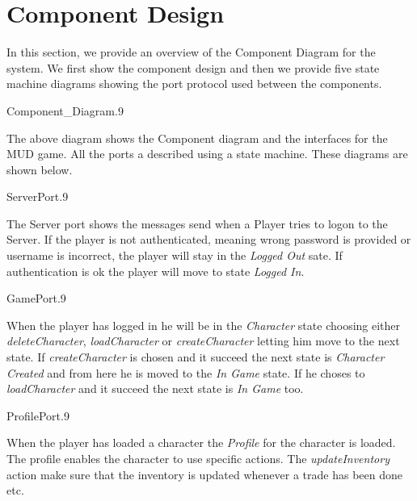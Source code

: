 \section{Component Design}
In this section, we provide an overview of the Component Diagram for the system. We first show the component design and then we provide five state machine diagrams showing the port protocol used between the components.

\begin{myfigure}{Component_Diagram}{.9}%
	\caption{Component Diagram of the MUD game}
	\label{fig:component-diagram}
\end{myfigure}

The above diagram shows the Component diagram and the interfaces for the MUD game. All the ports a described using a state machine. These diagrams are shown below.

\begin{myfigure}{ServerPort}{.9}%
	\caption{State machine for the Server port}
	\label{fig:server-port}
\end{myfigure}

The Server port shows the messages send when a Player tries to logon to the Server. If the player is not authenticated, meaning wrong password is provided or username is incorrect, the player will stay in the \emph{Logged Out} sate. If authentication is ok the player will move to state \emph{Logged In}.

\begin{myfigure}{GamePort}{.9}%
	\caption{State machine for the Game port}
	\label{fig:game-port}
\end{myfigure}

When the player has logged in he will be in the \emph{Character} state choosing either \emph{deleteCharacter}, \emph{loadCharacter} or \emph{createCharacter} letting him move to the next state. If \emph{createCharacter} is chosen and it succeed the next state is \emph{Character Created} and from here he is moved to the \emph{In Game} state. If he choses to \emph{loadCharacter} and it succeed the next state is \emph{In Game} too.

\begin{myfigure}{ProfilePort}{.9}%
	\caption{State machine for the Profile port}
	\label{fig:profile-port}
\end{myfigure}

When the player has loaded a character the \emph{Profile} for the character is loaded. The profile enables the character to use specific actions. The \emph{updateInventory} action make sure that the inventory is updated whenever a trade has been done etc.

